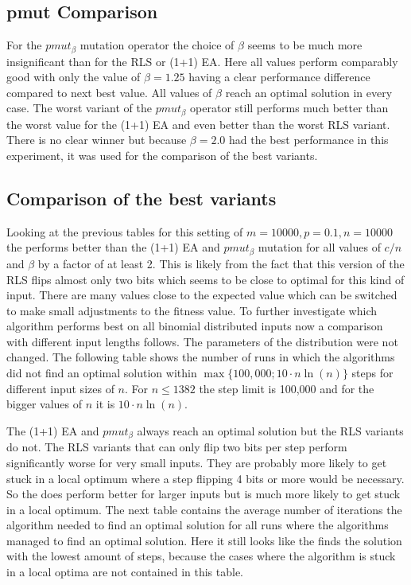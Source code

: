 \subsection{pmut Comparison}


For the $pmut_\beta$ mutation operator the choice of $\beta$ seems to be much more insignificant than for the RLS or (1+1) EA. Here all values perform comparably good with only the value of $\beta = 1.25$ having a clear performance difference compared to next best value. All values of $\beta$ reach an optimal solution in every case. The worst variant of the $pmut_\beta$ operator still performs much better than the worst value for the (1+1) EA and even better than the worst RLS variant. There is no clear winner but because $\beta=2.0$ had the best performance in this experiment, it was used for the comparison of the best variants.
\subsection{Comparison of the best variants}
% 
% 
Looking at the previous tables for this setting of $m=10000, p=0.1, n=10000$ the \RLSN[2] performs better than the  (1+1) EA and $pmut_\beta$ mutation for all values of $c/n$ and $\beta$ by a factor of at least 2.
This is likely from the fact that this version of the RLS flips almost only two bits which seems to be close to optimal for this kind of input.
There are many values close to the expected value which can be switched to make small adjustments to the fitness value.
To further investigate which algorithm performs best on all binomial distributed inputs now a comparison with different input lengths follows.
The parameters of the distribution were not changed.\newline
The following table shows the number of runs in which the algorithms did not find an optimal solution within $\max\{100,000;10 \cdot n\ln(n)\}$ steps for different input sizes of $n$.
For $n\le1382$ the step limit is 100,000 and for the bigger values of $n$ it is $10 \cdot n\ln(n)$.



The (1+1) EA and $pmut_\beta$ always reach an optimal solution but the RLS variants do not.
The RLS variants that can only flip two bits per step perform significantly worse for very small inputs.
They are probably more likely to get stuck in a local optimum where a step flipping 4 bits or more would be necessary.
So the \RLSN[2] does perform better for larger inputs but is much more likely to get stuck in a local optimum.
The next table contains the average number of iterations the algorithm needed to find an optimal solution for all runs where the algorithms managed to find an optimal solution.
Here it still looks like the \RLSN[2] finds the solution with the lowest amount of steps, because the cases where the algorithm is stuck in a local optima are not contained in this table.

